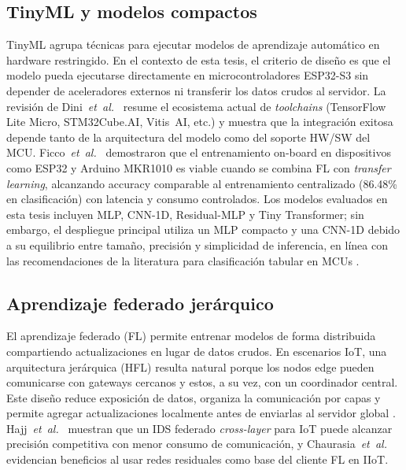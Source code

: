 \subsection{TinyML y modelos compactos}
TinyML agrupa técnicas para ejecutar modelos de aprendizaje automático en hardware restringido. En el contexto de esta tesis, el criterio de diseño es que el modelo pueda ejecutarse directamente en microcontroladores ESP32-S3 sin depender de aceleradores externos ni transferir los datos crudos al servidor. La revisión de Dini~\textit{et~al.}~\cite{Dini2024_EmbeddedIIoT_Review} resume el ecosistema actual de \emph{toolchains} (TensorFlow Lite Micro, STM32Cube.AI, Vitis~AI, etc.) y muestra que la integración exitosa depende tanto de la arquitectura del modelo como del soporte HW/SW del MCU. Ficco~\textit{et~al.}~\cite{Ficco2024_FL_TinyML_Onboard} demostraron que el entrenamiento on-board en dispositivos como ESP32 y Arduino MKR1010 es viable cuando se combina FL con \emph{transfer learning}, alcanzando accuracy comparable al entrenamiento centralizado (86.48\% en clasificación) con latencia y consumo controlados. Los modelos evaluados en esta tesis incluyen MLP, CNN-1D, Residual-MLP y Tiny Transformer; sin embargo, el despliegue principal utiliza un MLP compacto y una CNN-1D debido a su equilibrio entre tamaño, precisión y simplicidad de inferencia, en línea con las recomendaciones de la literatura para clasificación tabular en MCUs \cite{HeydariMahmoud2025_TinyML_IDS, Dini2024_EmbeddedIIoT_Review}.

\subsection{Aprendizaje federado jerárquico}
El aprendizaje federado (FL) permite entrenar modelos de forma distribuida compartiendo actualizaciones en lugar de datos crudos. En escenarios IoT, una arquitectura jerárquica (HFL) resulta natural porque los nodos edge pueden comunicarse con gateways cercanos y estos, a su vez, con un coordinador central. Este diseño reduce exposición de datos, organiza la comunicación por capas y permite agregar actualizaciones localmente antes de enviarlas al servidor global \cite{McMahan2017FedAvg, Imteaj2022_FL_ResourceConstrainedSurvey}. Hajj~\textit{et~al.}~\cite{Hajj2023_CrossLayerFL_IDS} muestran que un IDS federado \emph{cross-layer} para IoT puede alcanzar precisión competitiva con menor consumo de comunicación, y Chaurasia~\textit{et~al.}~\cite{Chaurasia2024_FL_ResNet_IIoT} evidencian beneficios al usar redes residuales como base del cliente FL en IIoT.

